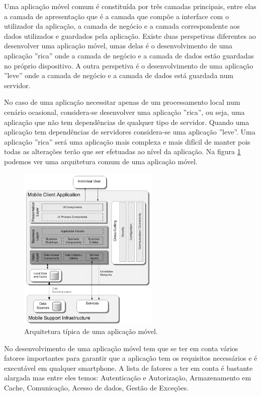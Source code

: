 Uma aplicação móvel comum é constituída por três camadas principais, entre elas a camada de apresentação que é a camada que compõe a interface com o utilizador da aplicação, a camada de negócio e a camada correspondente aos dados utilizados e guardados pela aplicação. Existe duas perspetivas diferentes ao desenvolver uma aplicação móvel, umas delas é o desenvolvimento de uma aplicação ''rica'' onde a camada de negócio e a camada de dados estão guardadas no próprio dispositivo. A outra perspetiva é o desenvolvimento de uma aplicação ''leve'' onde a camada de negócio e a camada de dados está guardada num servidor. 
\par
No caso de uma aplicação necessitar apenas de um processamento local num cenário ocasional, considera-se desenvolver uma aplicação ''rica'', ou seja, uma aplicação que não tem dependências de qualquer tipo de servidor. Quando uma aplicação tem dependências de servidores considera-se uma aplicação ''leve''. Uma aplicação ''rica'' será uma aplicação mais complexa e mais difícil de manter pois todas as alterações terão que ser efetuadas ao nível da aplicação.
Na figura \ref{f:mobileapparch} podemos ver uma arquitetura comum de uma aplicação móvel. \cite{mobileappbook}

\begin{figure}[H]
  \centering
  \includegraphics[width=0.6\textwidth]{imgs/mobileapparch.png}
  \caption[Arquitetura t\'ipica de uma  aplica\c c\~ao móvel]{Arquitetura t\'ipica de uma  aplica\c c\~ao móvel. \cite{mobileappbook}}
  
  \label{f:mobileapparch}
\end{figure}


No desenvolvimento de uma aplicação móvel tem que se ter em conta vários fatores importantes para garantir que a aplicação tem os requisitos necessários e é executável em qualquer smartphone. A lista de fatores a ter em conta é bastante alargada mas entre eles temos: Autenticação e Autorização, Armazenamento em Cache, Comunicação, Acesso de dados, Gestão de Exceções. \cite{mobileappbook}

